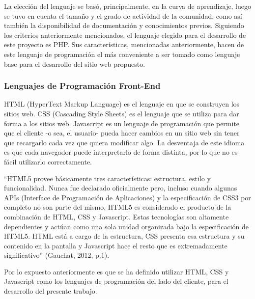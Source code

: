 \documentclass[11pt,oneside]{book}
\begin{document}
La elección del lenguaje se basó, principalmente, en la curva de aprendizaje, luego se tuvo en cuenta el tamaño y el grado de actividad de la comunidad, como así también la disponibilidad de documentación y conocimientos previos. Siguiendo los criterios anteriormente mencionados, el lenguaje elegido para el desarrollo de este proyecto es PHP. Sus características, mencionadas anteriormente, hacen de este lenguaje de programación el más conveniente a ser tomado como lenguaje base para el desarrollo del sitio web propuesto.

\subsubsection{Lenguajes de Programación Front-End}
HTML (HyperText Markup Language) es el lenguaje en que se construyen los sitios web. %
CSS (Cascading Style Sheets) es el lenguaje que se utiliza para dar forma a los sitios web. %
Javascript es un lenguaje de programación que permite que el cliente -o sea, el usuario- pueda hacer cambios en un sitio web sin tener que recargarlo cada vez que quiera modificar algo. %
La desventaja de este idioma es que cada navegador puede interpretarlo de forma distinta, por lo que no es fácil utilizarlo correctamente.

``HTML5 provee básicamente tres características: estructura, estilo y funcionalidad. Nunca fue declarado oficialmente pero, incluso cuando algunas APIs (Interface de Programación de Aplicaciones) y la especificación de CSS3 por completo no son parte del mismo, HTML5 es considerado el producto de la combinación de HTML, CSS y Javascript. Estas tecnologías son altamente dependientes y actúan como una sola unidad organizada bajo la especificación de HTML5. HTML está a cargo de la estructura, CSS presenta esa estructura y su contenido en la pantalla y Javascript hace el resto que es extremadamente significativo'' (Gauchat, 2012, p.1).

Por lo expuesto anteriormente es que se ha definido utilizar HTML, CSS y Javascript como los lenguajes de programación del lado del cliente, para el desarrollo del presente trabajo.

\newpage
\end{document}
